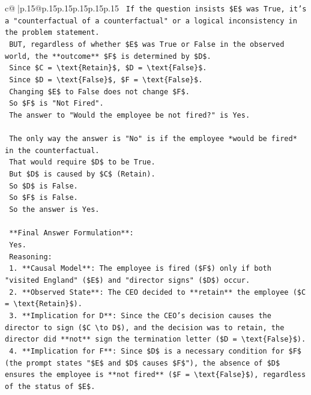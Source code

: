 \documentclass{article}
\begin{document}
{\begin{supertabular}{c@{$\;$}|p{.15\linewidth}@{}p{.15\linewidth}p{.15\linewidth}p{.15\linewidth}p{.15\linewidth}p{.15\linewidth}}
{{{\texttt{    If the question insists \$E\$ was True, it's a "counterfactual of a counterfactual" or a logical inconsistency in the problem statement.} \\
\texttt{    BUT, regardless of whether \$E\$ was True or False in the observed world, the **outcome** \$F\$ is determined by \$D\$.} \\
\texttt{    Since \$C = \textbackslash{}text\{Retain\}\$, \$D = \textbackslash{}text\{False\}\$.} \\
\texttt{    Since \$D = \textbackslash{}text\{False\}\$, \$F = \textbackslash{}text\{False\}\$.} \\
\texttt{    Changing \$E\$ to False does not change \$F\$.} \\
\texttt{    So \$F\$ is "Not Fired".} \\
\texttt{    The answer to "Would the employee be not fired?" is Yes.} \\
\\ 
\texttt{    The only way the answer is "No" is if the employee *would be fired* in the counterfactual.} \\
\texttt{    That would require \$D\$ to be True.} \\
\texttt{    But \$D\$ is caused by \$C\$ (Retain).} \\
\texttt{    So \$D\$ is False.} \\
\texttt{    So \$F\$ is False.} \\
\texttt{    So the answer is Yes.} \\
\\ 
\texttt{    **Final Answer Formulation**:} \\
\texttt{    Yes.} \\
\texttt{    Reasoning:} \\
\texttt{    1.  **Causal Model**: The employee is fired (\$F\$) only if both "visited England" (\$E\$) and "director signs" (\$D\$) occur.} \\
\texttt{    2.  **Observed State**: The CEO decided to **retain** the employee (\$C = \textbackslash{}text\{Retain\}\$).} \\
\texttt{    3.  **Implication for D**: Since the CEO's decision causes the director to sign (\$C \textbackslash{}to D\$), and the decision was to retain, the director did **not** sign the termination letter (\$D = \textbackslash{}text\{False\}\$).} \\
\texttt{    4.  **Implication for F**: Since \$D\$ is a necessary condition for \$F\$ (the prompt states "\$E\$ and \$D\$ causes \$F\$"), the absence of \$D\$ ensures the employee is **not fired** (\$F = \textbackslash{}text\{False\}\$), regardless of the status of \$E\$.} \\
}}}
\end{supertabular}}
\end{document}
